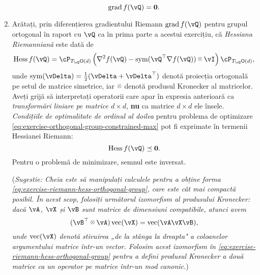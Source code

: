 \documentclass[../../book-main_ro.tex]{subfiles}
\begin{document}
\begin{exercise}
\begin{enumerate}
        \begin{equation*}
            \mathrm{grad}\, f(\vQ) = \mathbf{0}.
        \end{equation*}
        \item Arătați, prin diferențierea gradientului Riemann $\mathrm{grad}\, f(\vQ)$ pentru grupul ortogonal în raport cu $\vQ$ ca în prima parte a acestui exercițiu, că \textit{Hessiana Riemanniană} este dată de
        \begin{equation}\label{eq:exercise-riemann-hess-orthogonal-group}
            \mathrm{Hess}\, f(\vQ) = \cP_{T_{\vQ}\O(d)} \left( 
            \nabla^2 f(\vQ) - \Symm(\vQ^\top \nabla f(\vQ)) \kron \vI
            \right) \cP_{T_{\vQ}\O(d)},
        \end{equation}
        unde $\Symm(\vDelta) = \tfrac{1}{2}(\vDelta + \vDelta^\top)$ denotă proiecția ortogonală pe setul de matrice simetrice, iar $\kron$ denotă produsul Kronecker al matricelor.
        Aveți grijă să interpretați operatorii care apar în expresia anterioară ca \textit{transformări liniare pe matrice ${d \times d}$}, \textbf{nu} ca matrice $d \times d$ ele însele.
        \textit{Condițiile de optimalitate de ordinul al doilea} pentru problema de optimizare \eqref{eq:exercise-orthogonal-group-constrained-max} pot fi exprimate în termenii Hessianei Riemann:
        \begin{equation*}
            \mathrm{Hess}\, f(\vQ) \preceq \mathbf{0}.
        \end{equation*}
        Pentru o problemă de minimizare, semnul este inversat.

        (\textit{Sugestie: Cheia este să manipulați calculele pentru a obține forma \eqref{eq:exercise-riemann-hess-orthogonal-group}, care este cât mai compactă posibil. În acest scop, folosiți următorul izomorfism al produsului Kronecker: dacă $\vA$, $\vX$ și $\vB$ sunt matrice de dimensiuni compatibile, atunci avem
        \begin{equation*}
            (\vB^\top \kron \vA) \Vec(\vX) = \Vec(\vA \vX \vB),
        \end{equation*}
        unde $\Vec(\vX)$ denotă stivuirea „de la stânga la dreapta" a coloanelor argumentului matrice într-un vector. Folosim acest izomorfism în \eqref{eq:exercise-riemann-hess-orthogonal-group} pentru a defini produsul Kronecker a două matrice ca un operator pe matrice într-un mod canonic.})
        

\end{enumerate}
\end{exercise}
\end{document}
